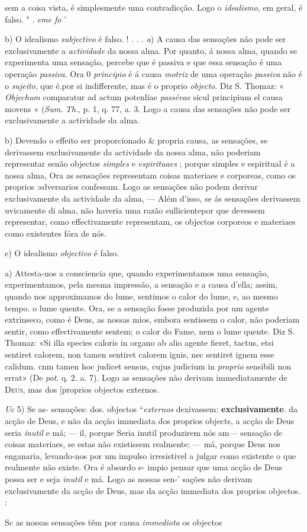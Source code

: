 sem a coisa vista, é simplesmente uma contradicção. Logo o \emph{idealismo}, em geral, é falso. " . \emph{eme fo} '\par b) O idealismo \emph{subjectivo} é falso. ! . . . \emph{a}) A causa das sensações não pode ser exclusivamente a \emph{actividade} da nossa alma. Por quanto, á nossa alma, quando se experimenta uma sensação, percebe que é passiva e que essa sensação é uma operação \emph{passiva}. Ora 0 \emph{principio} é á causa \emph{motriz} de uma operação \emph{passiva} não é o \emph{sujeito}, que é.por si indifferente, mas é o proprio \emph{objecto}. Diz S. Thomaz: « \emph{Objechum} comparatur ad actum potenliae \emph{passévae} sicul principium el causa movens » (\emph{Sum}. \emph{Th}., p. 1, q. 77, a. 3. Logo a causa das sensações não pode ser exclusivamente a actividade da alma.\par b) Devendo o effeito ser proporcionado \& propria causa, as sensações, se derivassem exclusivamente da actividade da nossa alma, não poderiam representar senão objectos \emph{simples} e \emph{espirituaes} ; porque simples e espiritual é a nossa alma, Ora as sensações representam coisas materiaes e corporeas, como os proprios :sdversarios confessam. Logo as sensações não podem derivar exclusivamente da actividade da alma, --- Além d'isso, se ás sensações derivassem uvicamente di alma, não haveria uma razão sullicientepor que devessem representar, como effectivamente representam, os objectos corporeos e materiaes como existentes fóra de nós.\par e) O idealismo \emph{objectivo} é falso.\par a) Attesta-nos a consciencia que, quando experimentamos uma sensação, experimentamos, pela mesma impressão, a sensação e a causa d'ella; assim, quando nos approximamos do lume, sentimos o calor do lume, e, ao mesmo tempo. o lume quente. Ora, se a sensação fosse produzida por um agente extrinseco, como é Deus, as nossas mios, embora sentissem o calor, não poderiam sentir, como effectivamente sentem; o calor do Fame, nem o lume quente. Diz S. Thomaz: «Si illa species caloris in organo ab alio agente fieret, tactus, etsi sentiret calorem, non tamen sentiret calorem ignis, nec sentiret ignem esse calidum. cnm tamen hoc judicet sensus, cujus judicium in \emph{proprio} sensibili non errat» (De \emph{pot}. q. 2. a. 7). Logo as sensações não derivam immediatamente de \textsc{Deus}, mas dos [proprios objectos externos.\par \emph{Uc} 5) Se as- sensações: dos. objectos “\emph{externos} dexivassem: \textbf{exclusivamente}. da acção de Deus, e não da acção immediata dos proprios objects, a acção de Deus seria \emph{inutil} e má; --- il, porque Seria inutil produzirem nós am--- sensação de coisas materiaes, se estas não existissem realmente; --- má, porque Deus nos enganaria, levando-nos por um impulso irresistivel a julgar como existente o que realmente não existe. Ora é absurdo e- impio pensar que uma acção de Deus possa ser e seja \emph{inutil} e má. Logo as nossas sen-' sações não derivam exclusivamente da acção de Deus, mas da acção immediata dos proprios objectos. :\par Sc as nossas sensações têm por causa \emph{immediota} os objectos 